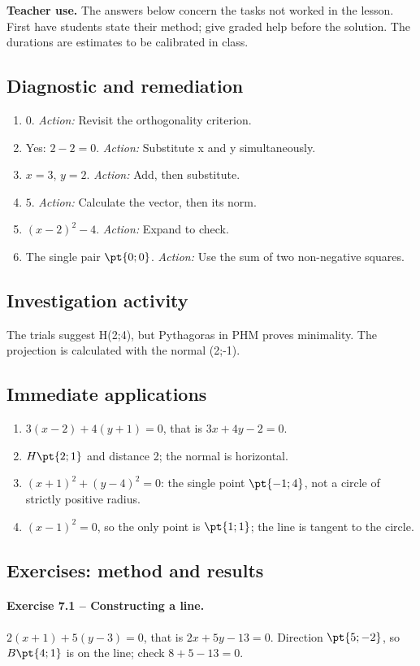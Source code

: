 \label{C07-CORR}
\textbf{Teacher use.} The answers below concern the tasks not worked in the lesson. First have students state their method; give graded help before the solution. The durations are estimates to be calibrated in class.
\subsection*{Diagnostic and remediation}
\begin{enumerate}
\item $0$. \textit{Action:} Revisit the orthogonality criterion.
\item Yes: $2-2=0$. \textit{Action:} Substitute x and y simultaneously.
\item $x=3$, $y=2$. \textit{Action:} Add, then substitute.
\item $5$. \textit{Action:} Calculate the vector, then its norm.
\item $(x-2)^2-4$. \textit{Action:} Expand to check.
\item The single pair $\pt{0;0}$. \textit{Action:} Use the sum of two non-negative squares.
\end{enumerate}
\subsection*{Investigation activity}
The trials suggest H(2;4), but Pythagoras in PHM proves minimality. The projection is calculated with the normal (2;-1).
\subsection*{Immediate applications}
\begin{enumerate}
\item $3(x-2)+4(y+1)=0$, that is $3x+4y-2=0$.
\item $H\pt{2;1}$ and distance 2; the normal is horizontal.
\item $(x+1)^2+(y-4)^2=0$: the single point $\pt{-1;4}$, not a circle of strictly positive radius.
\item $(x-1)^2=0$, so the only point is $\pt{1;1}$; the line is tangent to the circle.
\end{enumerate}
\subsection*{Exercises: method and results}
\paragraph{Exercise 7.1 -- Constructing a line.} $2(x+1)+5(y-3)=0$, that is $2x+5y-13=0$. Direction $\pt{5;-2}$, so $B\pt{4;1}$ is on the line; check $8+5-13=0$.
